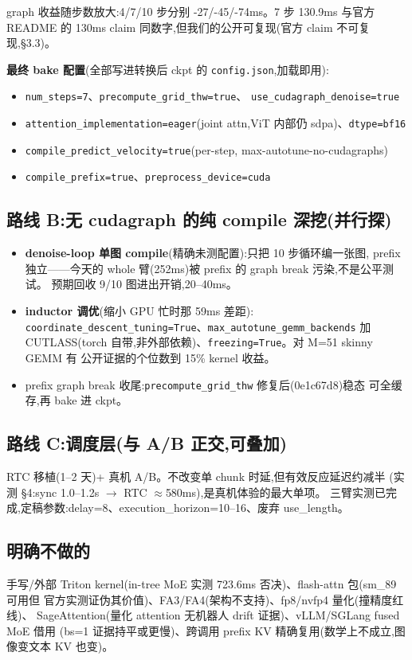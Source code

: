 \documentclass[11pt]{ctexart}
\begin{document}
graph 收益随步数放大:4/7/10 步分别 -27/-45/-74ms。7 步 130.9ms 与官方 README 的
130ms claim 同数字,但我们的公开可复现(官方 claim 不可复现,§3.3)。

\textbf{最终 bake 配置}(全部写进转换后 ckpt 的 \texttt{config.json},加载即用):
\begin{itemize}[itemsep=0pt,topsep=1pt,parsep=0pt]
\item \texttt{num\_steps=7}、\texttt{precompute\_grid\_thw=true}、
\texttt{use\_cudagraph\_denoise=true}
\item \texttt{attention\_implementation=eager}(joint attn,ViT 内部仍 sdpa)、\texttt{dtype=bf16}
\item \texttt{compile\_predict\_velocity=true}(per-step, max-autotune-no-cudagraphs)
\item \texttt{compile\_prefix=true}、\texttt{preprocess\_device=cuda}
\end{itemize}

\subsection{路线 B:无 cudagraph 的纯 compile 深挖(并行探)}
\begin{itemize}
\item \textbf{denoise-loop 单图 compile}(精确未测配置):只把 10 步循环编一张图,
prefix 独立——今天的 whole 臂(252ms)被 prefix 的 graph break 污染,不是公平测试。
预期回收 9/10 图进出开销,20--40ms。
\item \textbf{inductor 调优}(缩小 GPU 忙时那 59ms 差距):
\texttt{coordinate\_descent\_tuning=True}、\texttt{max\_autotune\_gemm\_backends} 加
CUTLASS(torch 自带,非外部依赖)、\texttt{freezing=True}。对 M=51 skinny GEMM 有
公开证据的个位数到 15\% kernel 收益。
\item prefix graph break 收尾:\texttt{precompute\_grid\_thw} 修复后(0e1c67d8)稳态
可全缓存,再 bake 进 ckpt。
\end{itemize}

\subsection{路线 C:调度层(与 A/B 正交,可叠加)}
RTC 移植(1--2 天)+ 真机 A/B。不改变单 chunk 时延,但有效反应延迟约减半
(实测 §4:sync 1.0--1.2s $\to$ RTC $\approx$580ms),是真机体验的最大单项。
三臂实测已完成,定稿参数:delay=8、execution\_horizon=10--16、废弃 use\_length。

\subsection{明确不做的}
手写/外部 Triton kernel(in-tree MoE 实测 723.6ms 否决)、flash-attn 包(sm\_89 可用但
官方实测证伪其价值)、FA3/FA4(架构不支持)、fp8/nvfp4 量化(撞精度红线)、
SageAttention(量化 attention 无机器人 drift 证据)、vLLM/SGLang fused MoE 借用
(bs=1 证据持平或更慢)、跨调用 prefix KV 精确复用(数学上不成立,图像变文本 KV 也变)。
\end{document}
